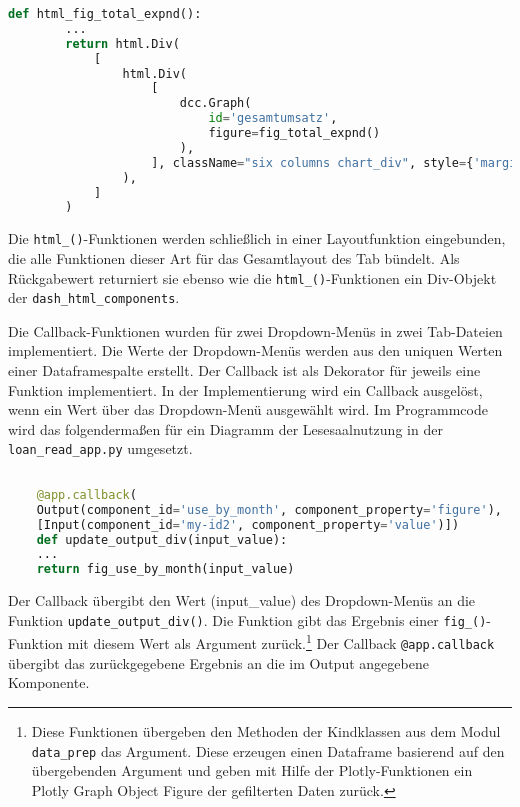     \begin{lstlisting}[language=Python, caption={html\_fig\_total\_expnd()}] 
        def html_fig_total_expnd():
        ...
        return html.Div(
            [
                html.Div(
                    [
                        dcc.Graph(
                            id='gesamtumsatz',
                            figure=fig_total_expnd()
                        ),
                    ], className="six columns chart_div", style={'margin-top': '20px', 'margin-left': '10px'}
                ),
            ]
        )
        \end{lstlisting}
    
    Die \texttt{html\_()}-Funktionen werden schließlich in einer Layoutfunktion eingebunden, die alle Funktionen dieser Art
    für das Gesamtlayout des Tab bündelt. Als Rückgabewert returniert sie ebenso wie die \texttt{html\_()}-Funktionen ein Div-Objekt der \texttt{dash\_html\_components}.


    Die Callback-Funktionen wurden für zwei Dropdown-Menüs in zwei Tab-Dateien implementiert.
    Die Werte der Dropdown-Menüs werden aus den uniquen Werten einer Dataframespalte erstellt.
    Der Callback ist als Dekorator für jeweils eine Funktion implementiert. 
    In der Implementierung wird ein Callback ausgelöst, wenn ein Wert über das Dropdown-Menü ausgewählt wird.
    Im Programmcode wird das folgendermaßen für ein Diagramm der Lesesaalnutzung in der \texttt{loan\_read\_app.py} umgesetzt.

    \begin{lstlisting}[language=Python, caption={html\_fig\_total\_expnd()}]        
    
    @app.callback(
    Output(component_id='use_by_month', component_property='figure'),
    [Input(component_id='my-id2', component_property='value')])
    def update_output_div(input_value):
    ...
    return fig_use_by_month(input_value)
    \end{lstlisting}


 
    Der Callback übergibt den Wert (input\_value) des Dropdown-Menüs an die Funktion \texttt{update\_output\_div()}. 
    Die Funktion gibt das Ergebnis einer \texttt{fig\_()}-Funktion mit diesem Wert als Argument zurück.\footnote{Diese Funktionen übergeben den Methoden der Kindklassen aus dem Modul \texttt{data\_prep} das Argument. 
    Diese erzeugen einen Dataframe basierend auf den übergebenden Argument und geben mit Hilfe der Plotly-Funktionen ein Plotly Graph Object Figure der gefilterten Daten zurück.}
    Der Callback \texttt{@app.callback} übergibt das zurückgegebene Ergebnis an die im Output angegebene Komponente.
    
